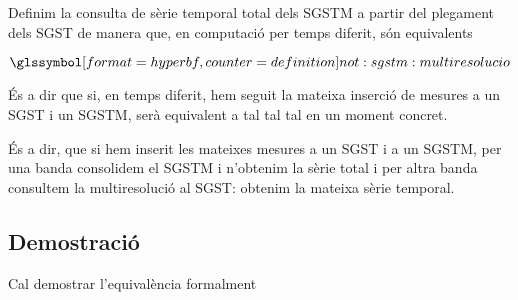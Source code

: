 Definim la consulta de sèrie temporal total dels \gls{SGSTM} a partir
del plegament dels \gls{SGST} de manera que, en computació per temps
diferit, són equivalents\todo{}


\begin{definition}
$\glssymboldef{not:sgstm:multiresolucio}$
\end{definition}








\todo{}
És a dir que  si, en temps diferit, hem seguit la mateixa inserció de mesures a un \gls{SGST} i un \gls{SGSTM}, 
serà equivalent a tal tal tal en un moment concret.

És a dir, que si hem inserit les mateixes mesures a un \gls{SGST} i a
un \gls{SGSTM}, per una banda consolidem el \gls{SGSTM} i n'obtenim la
sèrie total i per altra banda consultem la multiresolució al
\gls{SGST}: obtenim la mateixa sèrie temporal.


\subsection{Demostració}

Cal demostrar l'equivalència formalment\todo{}








